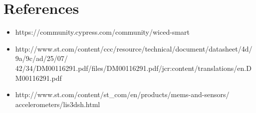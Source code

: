\documentclass[11pt,a4paper]{article}
\begin{document}
\newpage
	\section{References}
	 \begin{itemize}
	 \item https://community.cypress.com/community/wiced-smart
	 \item http://www.st.com/content/ccc/resource/technical/document/datasheet/4d/9a/9c/ad/25/07/\\42/34/DM00116291.pdf/files/DM00116291.pdf/jcr:content/translations/en.DM00116291.pdf
	 
	 \item http://www.st.com/content/st_com/en/products/mems-and-sensors/\\accelerometers/lis3dsh.html
	 
	
	     \end{itemize}
	    
\end{document}
